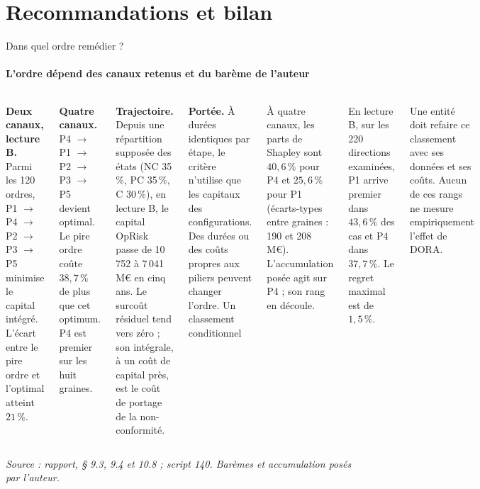 \documentclass[aspectratio=169,10pt,t]{beamer}
\newcommand{\source}[1]{\par\vfill{\tiny\color{gris}\textit{Source : #1}}\par\vspace{-1mm}}
\begin{document}
\section{Recommandations et bilan}
\begin{frame}{Dans quel ordre remédier ?}
  \framesubtitle{\ajout L'ordre dépend des canaux retenus et du barème de l'auteur}
  \begin{columns}[T,onlytextwidth]
    \footnotesize
    \textbf{Deux canaux, lecture B.} Parmi les 120 ordres, P1 $\to$ P4 $\to$ P2 $\to$ P3 $\to$ P5 minimise le capital intégré. L'écart entre le pire ordre et l'optimal atteint $21\,\%$.\par\vspace{1.5mm}
    \textbf{Quatre canaux.} P4 $\to$ P1 $\to$ P2 $\to$ P3 $\to$ P5 devient optimal. Le pire ordre coûte $38{,}7\,\%$ de plus que cet optimum. P4 est premier sur les huit graines.\par\vspace{1.5mm}
    \textbf{Trajectoire.} Depuis une répartition supposée des états (NC 35\,\%, PC 35\,\%, C 30\,\%), en lecture B, le capital OpRisk passe de 10\,752 à 7\,041 M€ en cinq ans. Le surcoût résiduel tend vers zéro ; son intégrale, à un coût de capital près, est le coût de portage de la non-conformité.\par\vspace{1.5mm}
    \textbf{Portée.} À durées identiques par étape, le critère n'utilise que les capitaux des configurations. Des durées ou des coûts propres aux piliers peuvent changer l'ordre.
    \footnotesize
    {\editorial\normalsize Un classement conditionnel}\par\vspace{1.5mm}
    À quatre canaux, les parts de Shapley sont $40{,}6\,\%$ pour P4 et $25{,}6\,\%$ pour P1 (écarts-types entre graines : 190 et 208 M€). L'accumulation posée agit sur P4 ; son rang en découle.\par\vspace{1.5mm}
    En lecture B, sur les 220 directions examinées, P1 arrive premier dans $43{,}6\,\%$ des cas et P4 dans $37{,}7\,\%$. Le regret maximal est de $1{,}5\,\%$.\par\vspace{1.5mm}
    Une entité doit refaire ce classement avec ses données et ses coûts. Aucun de ces rangs ne mesure empiriquement l'effet de DORA.
  \end{columns}
  \source{rapport, § 9.3, 9.4 et 10.8 ; script 140. Barèmes et accumulation posés par l'auteur.}
\end{frame}
\end{document}

